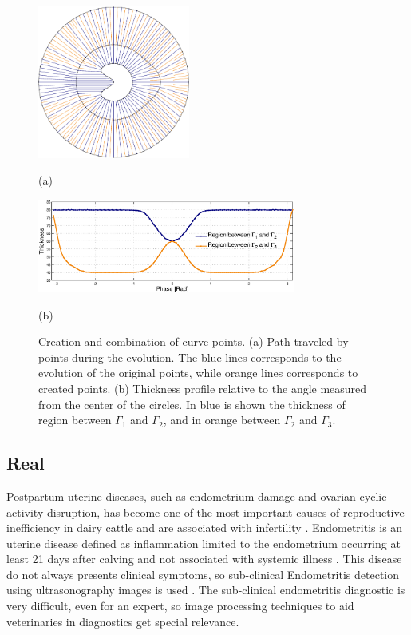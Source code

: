 \documentclass{article}
\begin{document}
\begin{figure}[t]
\begin{minipage}[b]{1\linewidth}
  \centering
  \centerline{\includegraphics[width=5cm]{pics/synth4}}
  \centerline{(a)}\medskip
\end{minipage}
\begin{minipage}[b]{1\linewidth}
  \centering
  \centerline{\includegraphics[width=8.5cm]{pics/synthWidth4}}
  \centerline{(b)}\medskip
\end{minipage}
\caption{Creation and combination of curve points. (a) Path traveled by points during the evolution. The blue lines corresponds to the evolution of the original points, while orange lines corresponds to created points. (b) Thickness profile relative to the angle measured from the center of the circles. In blue is shown the thickness of region between $\Gamma_1$ and $\Gamma_2$, and in orange between $\Gamma_2$ and $\Gamma_3$.}
\label{fig:synth}
\end{figure}

\subsection{Real}
\label{ssec:real}
Postpartum uterine diseases, such as endometrium damage and ovarian cyclic activity disruption, has become one of the most important causes of reproductive inefficiency in dairy cattle and are associated with infertility \cite{sheldon2008,barlund2008}. Endometritis is an uterine disease defined as inflammation limited to the endometrium occurring at least 21 days after calving and not associated with systemic illness \cite{sheldon2010}. This disease do not always presents clinical symptoms, so sub-clinical Endometritis detection using ultrasonography images is used \cite{Gianni2010, Gianni2013}. The sub-clinical endometritis diagnostic is very difficult, even for an expert, so image processing techniques to aid veterinaries in diagnostics get special relevance.
\end{document}

